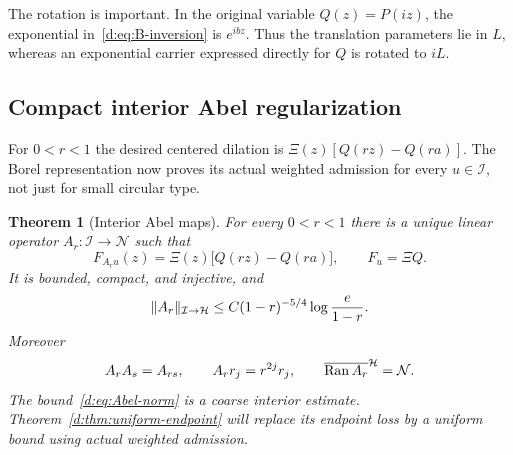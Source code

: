 \documentclass[11pt,a4paper]{article}
\numberwithin{equation}{section}
\newtheorem{theorem}{Theorem}[section]
\theoremstyle{definition}\newtheorem{definition}[theorem]{Definition}
\theoremstyle{remark}\newtheorem{remark}[theorem]{Remark}
\newcommand{\Hh}{\mathcal H}\newcommand{\Hw}{\mathcal H}
\newcommand{\Nn}{\mathcal N}\newcommand{\Ii}{\mathcal I}\newcommand{\Zz}{\mathcal Z}
\begin{document}
The rotation is important. In the original variable $Q(z)=P(iz)$, the exponential in~\eqref{d:eq:B-inversion} is $e^{ibz}$. Thus the translation parameters lie in $L$, whereas an exponential carrier expressed directly for $Q$ is rotated to $iL$.

\subsection{Compact interior Abel regularization}\label{d:sec:Abel-maps}

For $0<r<1$ the desired centered dilation is
$\Xi(z)[Q(rz)-Q(ra)]$. The Borel representation now proves its actual weighted admission for every $u\in\Ii$, not just for small circular type.

\begin{theorem}[Interior Abel maps]\label{d:thm:Abel-maps}
For every $0<r<1$ there is a unique linear operator $A_r:\Ii\to\Nn$ such that
\begin{equation}\label{d:eq:Abel-transform}
 F_{A_ru}(z)=\Xi(z)\bigl[Q(rz)-Q(ra)\bigr],
 \qquad F_u=\Xi Q.
\end{equation}
It is bounded, compact, and injective, and
\begin{equation}\label{d:eq:Abel-norm}
 \norm{A_r}_{\Ii\to\Hh}
 \le C(1-r)^{-5/4}\log\frac e{1-r}.
\end{equation}
Moreover
\begin{equation}\label{d:eq:Abel-semigroup}
 A_rA_s=A_{rs},\qquad A_rr_j=r^{2j}r_j,\qquad
 \overline{\Ran A_r}^{\Hh}=\Nn.
\end{equation}
The bound~\eqref{d:eq:Abel-norm} is a coarse interior estimate. Theorem~\ref{d:thm:uniform-endpoint} will replace its endpoint loss by a uniform bound using actual weighted admission.
\end{theorem}
\end{document}
